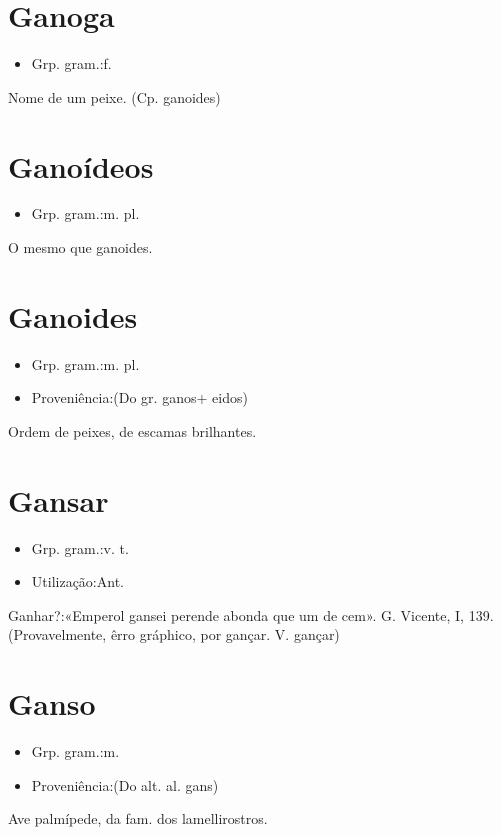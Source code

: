\section{Ganoga}
\begin{itemize}
\item {Grp. gram.:f.}
\end{itemize}
Nome de um peixe.
(Cp. \textunderscore ganoides\textunderscore )
\section{Ganoídeos}
\begin{itemize}
\item {Grp. gram.:m. pl.}
\end{itemize}
O mesmo que \textunderscore ganoides\textunderscore .
\section{Ganoides}
\begin{itemize}
\item {Grp. gram.:m. pl.}
\end{itemize}
\begin{itemize}
\item {Proveniência:(Do gr. \textunderscore ganos\textunderscore  + \textunderscore eidos\textunderscore )}
\end{itemize}
Ordem de peixes, de escamas brilhantes.
\section{Gansar}
\begin{itemize}
\item {Grp. gram.:v. t.}
\end{itemize}
\begin{itemize}
\item {Utilização:Ant.}
\end{itemize}
Ganhar?:«\textunderscore Emperol gansei perende abonda que um de cem\textunderscore ». G. Vicente, I, 139.
(Provavelmente, êrro gráphico, por \textunderscore gançar\textunderscore . V. \textunderscore gançar\textunderscore )
\section{Ganso}
\begin{itemize}
\item {Grp. gram.:m.}
\end{itemize}
\begin{itemize}
\item {Proveniência:(Do alt. al. \textunderscore gans\textunderscore )}
\end{itemize}
Ave palmípede, da fam. dos lamellirostros.
